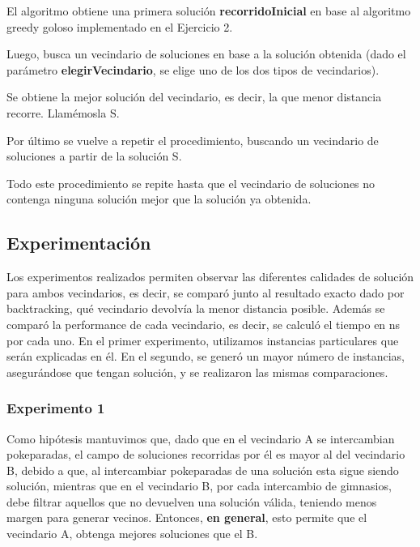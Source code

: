             El algoritmo obtiene una primera solución \textbf{recorridoInicial} en base al algoritmo greedy goloso implementado en el Ejercicio 2.
            \par Luego, busca un vecindario de soluciones en base a la solución obtenida (dado el parámetro \textbf{elegirVecindario}, se elige uno de los dos tipos de vecindarios).
            \par Se obtiene la mejor solución del vecindario, es decir, la que menor distancia recorre. Llamémosla S.
            \par Por último se vuelve a repetir el procedimiento, buscando un vecindario de soluciones a partir de la solución S.

            \par Todo este procedimiento se repite hasta que el vecindario de soluciones no contenga ninguna solución mejor que la solución ya obtenida.


    \subsection{Experimentación}
    Los experimentos realizados permiten observar las diferentes calidades de solución para ambos vecindarios, es decir, se comparó junto al resultado exacto dado por backtracking, qué vecindario devolvía la menor distancia posible. Además se comparó la performance de cada vecindario, es decir, se calculó el tiempo en ns por cada uno. En el primer experimento, utilizamos instancias particulares que serán explicadas en él. En el segundo, se generó un mayor número de instancias, asegurándose que tengan solución, y se realizaron las mismas comparaciones.



        \subsubsection{Experimento 1} 

            Como hipótesis mantuvimos que, dado que en el vecindario A se intercambian pokeparadas, el campo de soluciones recorridas por él es mayor al del vecindario B, debido a que, al intercambiar pokeparadas de una solución esta sigue siendo solución, mientras que en el vecindario B, por cada intercambio de gimnasios, debe filtrar aquellos que no devuelven una solución válida, teniendo menos margen para generar vecinos. Entonces, \textbf{en general}, esto permite que el vecindario A, obtenga mejores soluciones que el B. 

